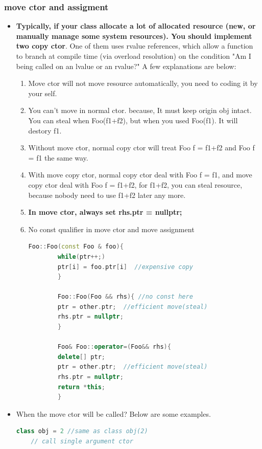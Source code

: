 \documentclass[a4paper,12pt,twoside]{book}
\begin{document}
\subsubsection{move ctor and assigment}
\begin{itemize}
	\item \textbf{Typically, if your class allocate a lot of allocated resource (new, or manually manage some system resources).  You should implement two copy ctor}. One of them uses rvalue references, which allow a function to branch at compile time (via overload resolution) on the condition "Am I being called on an lvalue or an rvalue?" A few explanations are below:
	
	\begin{enumerate}
		\item Move ctor will not move resource automatically, you need to coding it by your self.
		
		\item You can't move in normal ctor. because, It must keep origin obj intact.  You can steal when Foo(f1+f2), but when you used Foo(f1).  It will destory f1.
		
		\item Without  move ctor, normal copy ctor will treat Foo f = f1+f2 and Foo f = f1 the same way.
		
		\item With move copy ctor, normal copy ctor deal with Foo f = f1, and move copy ctor deal with Foo f = f1+f2, for f1+f2, you can steal resource, because nobody need to use f1+f2 later any more.
		
		\item \textbf{In move ctor, always set rhs.ptr = nullptr;}
		
		\item No const qualifier in move ctor and move assignment
		\begin{lstlisting}[frame=single, language=c++]
		Foo::Foo(const Foo & foo){
		while(ptr++;)
		ptr[i] = foo.ptr[i]  //expensive copy
		}
		
		Foo::Foo(Foo && rhs){ //no const here
		ptr = other.ptr;  //efficient move(steal)
		rhs.ptr = nullptr;
		}
		
		Foo& Foo::operator=(Foo&& rhs){
		delete[] ptr;
		ptr = other.ptr;  //efficient move(steal)
		rhs.ptr = nullptr;
		return *this;
		}
		\end{lstlisting}
		
	\end{enumerate}
	
	\item When the move ctor will be called? Below are some examples.
	\begin{lstlisting}[frame=single, language=c++]
	class obj = 2 //same as class obj(2)
	// call single argument ctor
	

\end{lstlisting}
\end{itemize}
\end{document}
